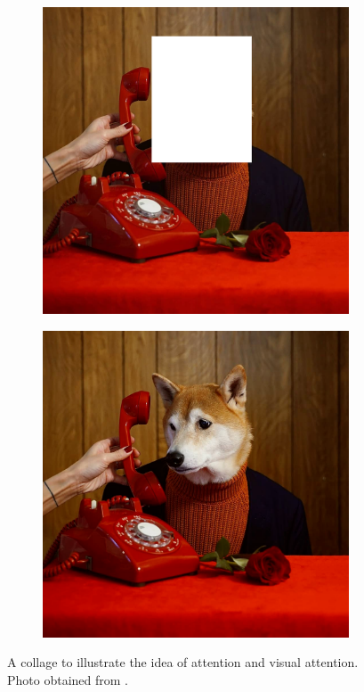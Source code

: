 \begin{figure}
\centering
\begin{subfigure}{.45\textwidth}
  \centering
  \includegraphics[width=1\linewidth]{figuras/dog_obscuro.png}
  \caption{}
  \label{img:dog_escondido}
\end{subfigure}
\begin{subfigure}{.45\textwidth}
  \centering
  \includegraphics[width=1\linewidth]{figuras/dog.png}
  \caption{}
  \label{img:dog}
\end{subfigure}
\caption{A collage to illustrate the idea of attention and visual attention. Photo obtained from \citet{dog}.}
\end{figure}



